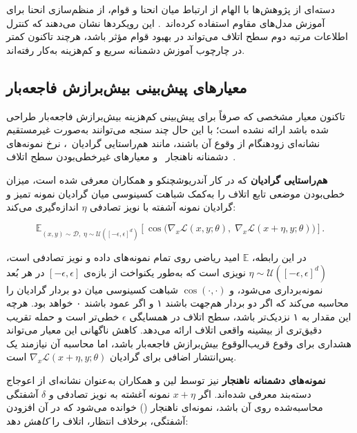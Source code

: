 \documentclass[11pt]{article}
\begin{document}
دسته‌ای از پژوهش‌ها با الهام از ارتباط میان انحنا و قوام،
از منظم‌سازی انحنا برای آموزش مدل‌های مقاوم استفاده کرده‌اند~\cite{moosavi2019robustness}.
این رویکردها نشان می‌دهند که کنترل اطلاعات مرتبه دوم سطح اتلاف می‌تواند در بهبود قوام مؤثر باشد،
هرچند تاکنون کمتر در چارچوب آموزش دشمنانه سریع و کم‌هزینه به‌کار رفته‌اند.

\subsection{معیارهای پیش‌بینی بیش‌برازش فاجعه‌بار}

تاکنون معیار مشخصی که صرفاً برای پیش‌بینی کم‌هزینه‌ بیش‌برازش فاجعه‌بار طراحی شده باشد ارائه نشده است؛
با این حال چند سنجه می‌توانند به‌صورت غیرمستقیم نشانه‌ای زودهنگام از وقوع آن باشند،
مانند هم‌راستایی گرادیان~\cite{andriushchenko2020understanding}،
نرخ نمونه‌های دشمنانه‌ ناهنجار~\cite{lin2023eliminating}
و معیارهای غیرخطی‌بودن سطح اتلاف~\cite{rocamora2024efficient}.

\textbf{هم‌راستایی گرادیان} که در کار آندریوشچنکو و همکاران \cite{andriushchenko2020understanding} معرفی شده است،
میزان خطی‌بودن موضعی تابع اتلاف را به‌کمک شباهت کسینوسی میان گرادیان نمونه‌ تمیز
و گرادیان نمونه‌ آشفته با نویز تصادفی $\eta$ اندازه‌گیری می‌کند:

\begin{equation}
\mathbb{E}_{(x,y)\sim\mathcal{D},\; \eta\sim\mathcal{U}([-\epsilon,\epsilon]^d)} \left[ \cos\!\big( \nabla_x \mathcal{L}(x, y; \theta),\; \nabla_x \mathcal{L}(x+\eta, y; \theta) \big) \right].
\end{equation}

در این رابطه، $\mathbb{E}$ امید ریاضی روی تمام نمونه‌های داده و نویز تصادفی است،
$\eta \sim \mathcal{U}([-\epsilon,\epsilon]^d)$ نویزی است که به‌طور یکنواخت از بازه‌ی $[-\epsilon,\epsilon]$ در هر بُعد نمونه‌برداری می‌شود،
و $\cos(\cdot,\cdot)$ شباهت کسینوسی میان دو بردار گرادیان را محاسبه می‌کند
که اگر دو بردار هم‌جهت باشند ۱ و اگر عمود باشند ۰ خواهد بود.
هرچه این مقدار به ۱ نزدیک‌تر باشد، سطح اتلاف در همسایگی $\epsilon$ خطی‌تر است
و حمله‌  تقریب دقیق‌تری از بیشینه‌ واقعی اتلاف ارائه می‌دهد.
کاهش ناگهانی این معیار می‌تواند هشداری برای وقوع قریب‌الوقوع بیش‌برازش فاجعه‌بار باشد،
اما محاسبه‌ آن نیازمند یک پس‌انتشار اضافی برای گرادیان $\nabla_x \mathcal{L}(x+\eta, y; \theta)$ است.

\textbf{نمونه‌های دشمنانه‌ ناهنجار} نیز توسط لین و همکاران \cite{lin2023eliminating} به‌عنوان نشانه‌ای از اعوجاج دسته‌بند معرفی شده‌اند.
اگر $x+\eta$ نمونه‌ آغشته به نویز تصادفی و $\delta$ آشفتگی  محاسبه‌شده روی آن باشد،
نمونه‌ای ناهنجار () خوانده می‌شود که در آن افزودن آشفتگی، برخلاف انتظار،
اتلاف را \textit{کاهش} دهد:
\end{document}
